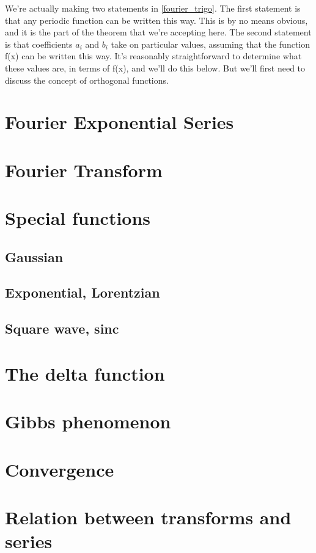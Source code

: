We're actually making two statements in \cref{fourier_trigo}. The first statement is that any periodic function can be written this way. This is by no means obvious, and it is the part of the theorem that we're accepting here. The second statement is that coefficients $a_i$ and $b_i$ take on particular values, assuming that the function f(x) can be written this way. It's reasonably straightforward to determine what these values are, in terms of f(x), and we'll do this below. But we'll first need to discuss the concept of orthogonal functions.

\section{Fourier Exponential Series}

\section{Fourier Transform}

\section{Special functions}
\subsection{Gaussian}
\subsection{Exponential, Lorentzian}
\subsection{Square wave, sinc}

\section{The delta function}

\section{Gibbs phenomenon}

\section{Convergence}

\section{Relation between transforms and series}

